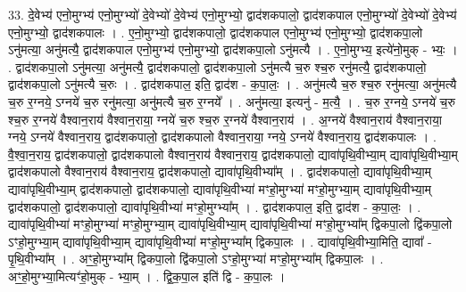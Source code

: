 \documentclass[17pt]{extarticle}
\begin{document}
33. दे॒वेभ्य॑ एनो॒मुग्भ्य॑ एनो॒मुग्भ्यो॑ दे॒वेभ्यो॑ दे॒वेभ्य॑ एनो॒मुग्भ्यो॒ द्वाद॑शकपालो॒ द्वाद॑शकपाल एनो॒मुग्भ्यो॑ दे॒वेभ्यो॑ दे॒वेभ्य॑ एनो॒मुग्भ्यो॒ द्वाद॑शकपालः । . ए॒नो॒मुग्भ्यो॒ द्वाद॑शकपालो॒ द्वाद॑शकपाल एनो॒मुग्भ्य॑ एनो॒मुग्भ्यो॒ द्वाद॑शकपा॒लो ऽनु॑मत्या॒ अनु॑मत्यै॒ द्वाद॑शकपाल एनो॒मुग्भ्य॑ एनो॒मुग्भ्यो॒ द्वाद॑शकपा॒लो ऽनु॑मत्यै । . ए॒नो॒मुग्भ्य॒ इत्ये॑नो॒मुक् - भ्यः॒ । . द्वाद॑शकपा॒लो ऽनु॑मत्या॒ अनु॑मत्यै॒ द्वाद॑शकपालो॒ द्वाद॑शकपा॒लो ऽनु॑मत्यै च॒रु श्च॒रु रनु॑मत्यै॒ द्वाद॑शकपालो॒ द्वाद॑शकपा॒लो ऽनु॑मत्यै च॒रुः । . द्वाद॑शकपाल॒ इति॒ द्वाद॑श - क॒पा॒लः॒ । . अनु॑मत्यै च॒रु श्च॒रु रनु॑मत्या॒ अनु॑मत्यै च॒रु र॒ग्नये॒ ऽग्नये॑ च॒रु रनु॑मत्या॒ अनु॑मत्यै च॒रु र॒ग्नये᳚ । . अनु॑मत्या॒ इत्यनु॑ - म॒त्यै॒ । . च॒रु र॒ग्नये॒ ऽग्नये॑ च॒रु श्च॒रु र॒ग्नये॑ वैश्वान॒राय॑ वैश्वान॒राया॒ ग्नये॑ च॒रु श्च॒रु र॒ग्नये॑ वैश्वान॒राय॑ । . अ॒ग्नये॑ वैश्वान॒राय॑ वैश्वान॒राया॒ ग्नये॒ ऽग्नये॑ वैश्वान॒राय॒ द्वाद॑शकपालो॒ द्वाद॑शकपालो वैश्वान॒राया॒ ग्नये॒ ऽग्नये॑ वैश्वान॒राय॒ द्वाद॑शकपालः । . वै॒श्वा॒न॒राय॒ द्वाद॑शकपालो॒ द्वाद॑शकपालो वैश्वान॒राय॑ वैश्वान॒राय॒ द्वाद॑शकपालो॒ द्यावा॑पृथि॒वीभ्या॒म् द्यावा॑पृथि॒वीभ्या॒म् द्वाद॑शकपालो वैश्वान॒राय॑ वैश्वान॒राय॒ द्वाद॑शकपालो॒ द्यावा॑पृथि॒वीभ्या᳚म् । . द्वाद॑शकपालो॒ द्यावा॑पृथि॒वीभ्या॒म् द्यावा॑पृथि॒वीभ्या॒म् द्वाद॑शकपालो॒ द्वाद॑शकपालो॒ द्यावा॑पृथि॒वीभ्या॑ मꣳहो॒मुग्भ्या॑ मꣳहो॒मुग्भ्या॒म् द्यावा॑पृथि॒वीभ्या॒म् द्वाद॑शकपालो॒ द्वाद॑शकपालो॒ द्यावा॑पृथि॒वीभ्या॑ मꣳहो॒मुग्भ्या᳚म् । . द्वाद॑शकपाल॒ इति॒ द्वाद॑श - क॒पा॒लः॒ । . द्यावा॑पृथि॒वीभ्या॑ मꣳहो॒मुग्भ्या॑ मꣳहो॒मुग्भ्या॒म् द्यावा॑पृथि॒वीभ्या॒म् द्यावा॑पृथि॒वीभ्या॑ मꣳहो॒मुग्भ्या᳚म् द्विकपा॒लो द्वि॑कपा॒लो ऽꣳहो॒मुग्भ्या॒म् द्यावा॑पृथि॒वीभ्या॒म् द्यावा॑पृथि॒वीभ्या॑ मꣳहो॒मुग्भ्या᳚म् द्विकपा॒लः । . द्यावा॑पृथि॒वीभ्या॒मिति॒ द्यावा᳚ - पृ॒थि॒वीभ्या᳚म् । . अꣳ॒॒हो॒मुग्भ्या᳚म् द्विकपा॒लो द्वि॑कपा॒लो ऽꣳहो॒मुग्भ्या॑ मꣳहो॒मुग्भ्या᳚म् द्विकपा॒लः । . अꣳ॒॒हो॒मुग्भ्या॒मित्यꣳ॑हो॒मुक् - भ्या॒म् । . द्वि॒क॒पा॒ल इति॑ द्वि - क॒पा॒लः । \newline
\pagebreak
{}
\end{document}

